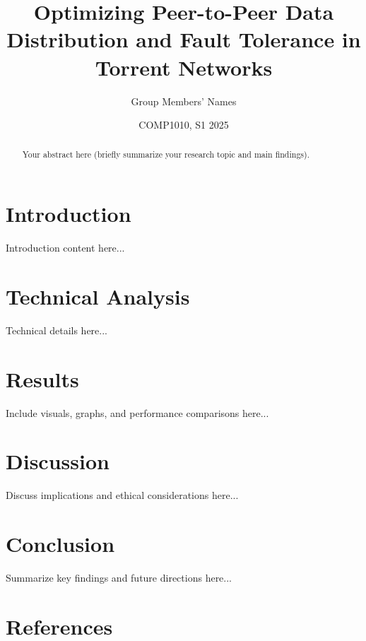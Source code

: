 \documentclass[a0,landscape]{a0poster}
\title{Optimizing Peer-to-Peer Data Distribution and Fault Tolerance in Torrent Networks}
\author{Group Members' Names}
\date{COMP1010, S1 2025}
\begin{document}
\maketitle

\begin{abstract}
Your abstract here (briefly summarize your research topic and main findings).
\end{abstract}

\begin{multicols}{3}

\section{Introduction}
Introduction content here...

\section{Technical Analysis}
Technical details here...

\section{Results}
Include visuals, graphs, and performance comparisons here...

\section{Discussion}
Discuss implications and ethical considerations here...

\section{Conclusion}
Summarize key findings and future directions here...

\section*{References}



\end{multicols}
\end{document}

